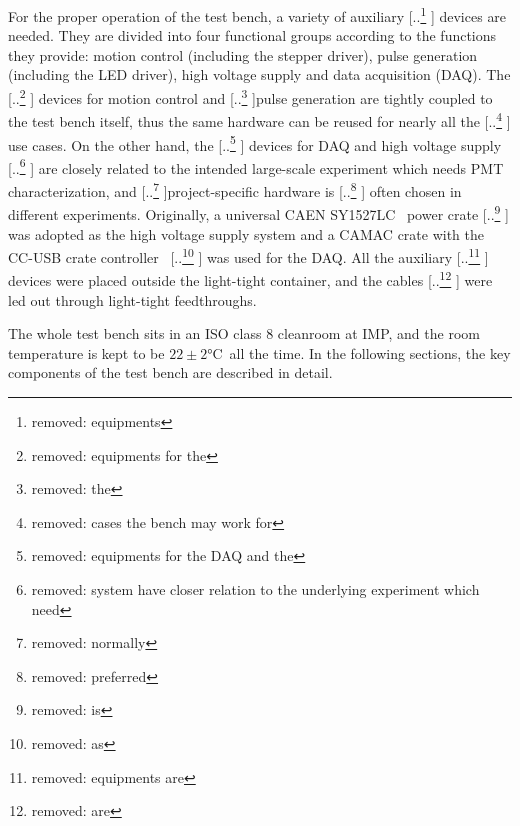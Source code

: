 \documentclass{nst}
\providecommand{\DIFadd}[1]{{\protect\color{blue} \sf #1}} %
\providecommand{\DIFdel}[1]{{\protect\color{red} [..\footnote{removed: #1} ]}} %
\providecommand{\DIFaddbegin}{} %
\providecommand{\DIFaddend}{} %
\providecommand{\DIFdelbegin}{} %
\providecommand{\DIFdelend}{} %
\begin{document}
For the proper operation of the test bench, a variety of auxiliary \DIFdelbegin \DIFdel{equipments }\DIFdelend \DIFaddbegin \DIFadd{devices }\DIFaddend are needed. 
They are divided into four \DIFaddbegin \DIFadd{functional }\DIFaddend groups according to the functions they provide: motion control (including the stepper driver), pulse generation (including the LED driver), high voltage supply and data acquisition (DAQ).
The \DIFdelbegin \DIFdel{equipments for the }\DIFdelend \DIFaddbegin \DIFadd{devices for }\DIFaddend motion control and \DIFdelbegin \DIFdel{the }\DIFdelend pulse generation are tightly coupled to the test bench itself, thus the same hardware can be reused for nearly all the \DIFdelbegin \DIFdel{cases the bench may work for}\DIFdelend \DIFaddbegin \DIFadd{use cases}\DIFaddend .
On the other hand, the \DIFdelbegin \DIFdel{equipments for the DAQ and the }\DIFdelend \DIFaddbegin \DIFadd{devices for DAQ and }\DIFaddend high voltage supply \DIFdelbegin \DIFdel{system have closer relation to the underlying experiment which need }\DIFdelend \DIFaddbegin \DIFadd{are closely related to the intended large-scale experiment which needs }\DIFaddend PMT characterization, and \DIFdelbegin \DIFdel{normally }\DIFdelend project-specific hardware is \DIFdelbegin \DIFdel{preferred }\DIFdelend \DIFaddbegin \DIFadd{often chosen }\DIFaddend in different experiments.
Originally, a universal CAEN SY1527LC~\cite{sy1527lc} power crate \DIFdelbegin \DIFdel{is }\DIFdelend \DIFaddbegin \DIFadd{was }\DIFaddend adopted as the high voltage supply system and a CAMAC crate with the CC-USB crate controller~\cite{cc_usb} \DIFdelbegin \DIFdel{as }\DIFdelend \DIFaddbegin \DIFadd{was used for }\DIFaddend the DAQ.
All the auxiliary \DIFdelbegin \DIFdel{equipments are }\DIFdelend \DIFaddbegin \DIFadd{devices were }\DIFaddend placed outside the light-tight container, and the cables \DIFdelbegin \DIFdel{are }\DIFdelend \DIFaddbegin \DIFadd{were }\DIFaddend led out through light-tight feedthroughs.

The whole test bench sits in an ISO class 8 cleanroom at IMP, and the room temperature is kept to be $22\pm2$\si{\celsius}~all the time. 
In the following sections, the key components of the test bench are described in detail.
\end{document}

